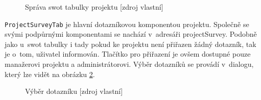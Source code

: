     \begin{figure}[ht]
    \begin{center}
    \caption{Správa swot tabulky projektu [zdroj vlastní]}
    \label{swotinfo}
    \end{center}
    \end{figure}
    
\texttt{ProjectSurveyTab} je hlavní dotazníkovou komponentou projektu. Společně se svými podpůrnými komponentami se nachází v~adresáři projectSurvey. Podobně jako u~swot tabulky i tady pokud ke projektu není přiřazen žádný dotazník, tak je o~tom, uživatel informován. Tlačítko pro přiřazení je ovšem dostupné pouze manažerovi projektu a administrátorovi. Výběr dotazníků se provádí v~dialogu, který lze vidět na obrázku \ref{addDotaznik}.

    \begin{figure}[!htbp]
    \begin{center}
    \caption{Výběr dotazníku [zdroj vlastní]}
    \label{addDotaznik}
    \end{center}
    \end{figure}
    
